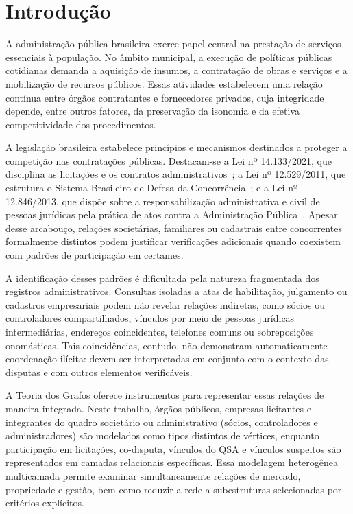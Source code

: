 \section{Introdução}
\label{sec:introducao}

A administração pública brasileira exerce papel central na prestação de serviços essenciais à população. No âmbito municipal, a execução de políticas públicas cotidianas demanda a aquisição de insumos, a contratação de obras e serviços e a mobilização de recursos públicos. Essas atividades estabelecem uma relação contínua entre órgãos contratantes e fornecedores privados, cuja integridade depende, entre outros fatores, da preservação da isonomia e da efetiva competitividade dos procedimentos.

A legislação brasileira estabelece princípios e mecanismos destinados a proteger a competição nas contratações públicas. Destacam-se a Lei nº 14.133/2021, que disciplina as licitações e os contratos administrativos~\cite{brasil2021licitacoes}; a Lei nº 12.529/2011, que estrutura o Sistema Brasileiro de Defesa da Concorrência~\cite{brasil2011concorrencia}; e a Lei nº 12.846/2013, que dispõe sobre a responsabilização administrativa e civil de pessoas jurídicas pela prática de atos contra a Administração Pública~\cite{brasil2013anticorrupcao}. Apesar desse arcabouço, relações societárias, familiares ou cadastrais entre concorrentes formalmente distintos podem justificar verificações adicionais quando coexistem com padrões de participação em certames.

A identificação desses padrões é dificultada pela natureza fragmentada dos registros administrativos. Consultas isoladas a atas de habilitação, julgamento ou cadastros empresariais podem não revelar relações indiretas, como sócios ou controladores compartilhados, vínculos por meio de pessoas jurídicas intermediárias, endereços coincidentes, telefones comuns ou sobreposições onomásticas. Tais coincidências, contudo, não demonstram automaticamente coordenação ilícita: devem ser interpretadas em conjunto com o contexto das disputas e com outros elementos verificáveis.

A Teoria dos Grafos oferece instrumentos para representar essas relações de maneira integrada. Neste trabalho, órgãos públicos, empresas licitantes e integrantes do quadro societário ou administrativo (sócios, controladores e administradores) são modelados como tipos distintos de vértices, enquanto participação em licitações, co-disputa, vínculos do QSA e vínculos suspeitos são representados em camadas relacionais específicas. Essa modelagem heterogênea multicamada permite examinar simultaneamente relações de mercado, propriedade e gestão, bem como reduzir a rede a subestruturas selecionadas por critérios explícitos.

